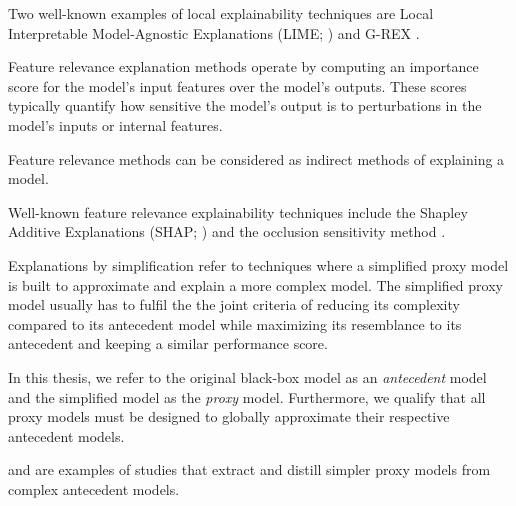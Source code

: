 \begin{remark}
  Two well-known examples of local explainability techniques are Local
  Interpretable Model-Agnostic Explanations (LIME; \citealt{lime}) and G-REX
  \citep{konig2008g}.
\end{remark}

\begin{definition}
  Feature relevance explanation methods operate by computing an importance score
  for the model's input features over the model's outputs. These
  scores typically quantify how sensitive the model's output is to perturbations
  in the model's inputs or internal features.
\end{definition}

\begin{remark}
  Feature relevance methods can be considered as indirect methods of explaining
  a model.
\end{remark}

\begin{remark}
  Well-known feature relevance explainability techniques include the Shapley
  Additive Explanations (SHAP; \citealt{lundberg2017unified}) and the occlusion
  sensitivity method \citep{zeiler2014visualizing}.
\end{remark}

\begin{definition}
  \label{def:explain_simplify}
  Explanations by simplification refer to techniques where a simplified proxy
  model is built to approximate and explain a more complex model. The simplified
  proxy model usually has to fulfil the the joint criteria of reducing its
  complexity compared to its antecedent model while maximizing its resemblance
  to its antecedent and keeping a similar performance score.
\end{definition}

\begin{remark}
  In this thesis, we refer to the original black-box model as an
  \textit{antecedent} model and the simplified model as the \textit{proxy}
  model. Furthermore, we qualify that all proxy models must be designed to
  globally approximate their respective antecedent models.
\end{remark}

\begin{remark}
  \citet{bastani2017interpretability} and \citet{tan2018distill} are examples of
  studies that extract and distill simpler proxy models from complex antecedent
  models.
\end{remark}

